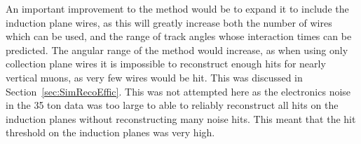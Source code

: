 
An important improvement to the method would be to expand it to include the induction plane wires, as this will greatly increase both the number of wires which can be used, and the range of track angles whose interaction times can be predicted. The angular range of the method would increase, as when using only collection plane wires it is impossible to reconstruct enough hits for nearly vertical muons, as very few wires would be hit. This was discussed in Section~\ref{sec:SimRecoEffic}. This was not attempted here as the electronics noise in the 35 ton data was too large to able to reliably reconstruct all hits on the induction planes without reconstructing many noise hits. This meant that the hit threshold on the induction planes was very high. \\
